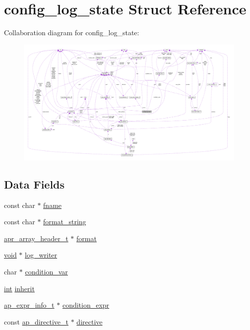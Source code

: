 \hypertarget{structconfig__log__state}{}\section{config\+\_\+log\+\_\+state Struct Reference}
\label{structconfig__log__state}


Collaboration diagram for config\+\_\+log\+\_\+state\+:
\nopagebreak
\begin{figure}[H]
\begin{center}
\leavevmode
\includegraphics[width=350pt]{structconfig__log__state__coll__graph}
\end{center}
\end{figure}
\subsection*{Data Fields}
\begin{DoxyCompactItemize}
\item 
const char $\ast$ \hyperlink{structconfig__log__state_a34a82ba48a1ebd328e107ccfdec6301f}{fname}
\item 
const char $\ast$ \hyperlink{structconfig__log__state_a8bca6ebd3c2662b41557cbb54347aed9}{format\+\_\+string}
\item 
\hyperlink{structapr__array__header__t}{apr\+\_\+array\+\_\+header\+\_\+t} $\ast$ \hyperlink{structconfig__log__state_af42f80d176582ade7a4ccd39da3219e6}{format}
\item 
\hyperlink{group__MOD__ISAPI_gacd6cdbf73df3d9eed42fa493d9b621a6}{void} $\ast$ \hyperlink{structconfig__log__state_a8dd142a982c92388f8e875042a7de150}{log\+\_\+writer}
\item 
char $\ast$ \hyperlink{structconfig__log__state_a4270658aeeffd59169678f32e00f315f}{condition\+\_\+var}
\item 
\hyperlink{pcre_8txt_a42dfa4ff673c82d8efe7144098fbc198}{int} \hyperlink{structconfig__log__state_a32f311f0d30084289e41ba6ea00e71c4}{inherit}
\item 
\hyperlink{structap__expr__info__t}{ap\+\_\+expr\+\_\+info\+\_\+t} $\ast$ \hyperlink{structconfig__log__state_aac39b4c687d98be1023d0789551c2ca7}{condition\+\_\+expr}
\item 
const \hyperlink{structap__directive__t}{ap\+\_\+directive\+\_\+t} $\ast$ \hyperlink{structconfig__log__state_a16eaf38f7319d1e9845c6373bc05131a}{directive}
\end{DoxyCompactItemize}


